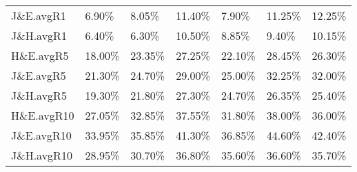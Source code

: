 \begin{table}
\begin{tabular}{l|llllll}
J\&E.avgR1   &                6.90\% &                     8.05\% &                  11.40\% &         7.90\% &              11.25\% &              12.25\% \\
J\&H.avgR1   &                6.40\% &                     6.30\% &                  10.50\% &         8.85\% &               9.40\% &              10.15\% \\
\midrule
H\&E.avgR5   &               18.00\% &                    23.35\% &                  27.25\% &        22.10\% &              28.45\% &              26.30\% \\
J\&E.avgR5   &               21.30\% &                    24.70\% &                  29.00\% &        25.00\% &              32.25\% &              32.00\% \\
J\&H.avgR5   &               19.30\% &                    21.80\% &                  27.30\% &        24.70\% &              26.35\% &              25.40\% \\
\midrule
H\&E.avgR10  &               27.05\% &                    32.85\% &                  37.55\% &        31.80\% &              38.00\% &              36.00\% \\
J\&E.avgR10  &               33.95\% &                    35.85\% &                  41.30\% &        36.85\% &              44.60\% &              42.40\% \\
J\&H.avgR10  &               28.95\% &                    30.70\% &                  36.80\% &        35.60\% &              36.60\% &              35.70\% \\
\bottomrule
\end{tabular}




\end{table}
